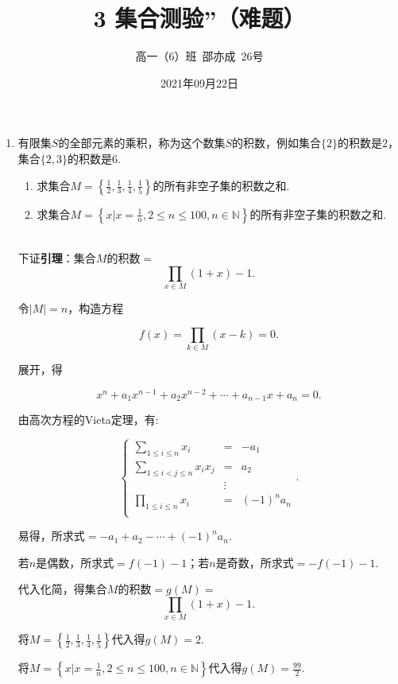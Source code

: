 \documentclass[8pt]{article}
\author{高一（6）班\ 邵亦成\ 26号}
\title{3 集合测验''（难题）}
\date{2021年09月22日}
\begin{document}
	\maketitle

	\begin{enumerate}

		\item
			有限集$S$的全部元素的乘积，称为这个数集$S$的积数，例如集合$\{2\}$的积数是$2$，集合$\{2,3\}$的积数是$6$.

			\begin{enumerate}[ (1) ]

				\item 求集合$M=\left\{\frac{1}{2},\frac{1}{3},\frac{1}{4},\frac{1}{5}\right\}$的所有非空子集的积数之和.

				\item 求集合$M=\left\{x|x=\frac{1}{n},2\leq n\leq100, n\in\mathbb{N}\right\}$的所有非空子集的积数之和.

			\end{enumerate}

			~\\

			下证\textbf{引理}：集合$M$的积数$=$$$\prod_{x\in M}(1+x)-1.$$

			令$|M|=n$，构造方程

			$$f(x)=\prod_{k\in M}(x-k)=0.$$

			展开，得

			$$x^n+a_1x^{n-1}+a_2x^{n-2}+\cdots+a_{n-1}x+a_n=0.$$

			由高次方程的Vieta定理，有:

			$$
			\left\{
			\begin{array}{rcl}
			\sum_{1\leq i \leq n}x_i&=&-a_1\\
			\sum_{1\leq i < j \leq n}x_ix_j&=&a_2\\
			&\vdots&\\
			\prod_{1\leq i \leq n}x_i&=&(-1)^{n}a_n\\
			\end{array}
			\right..
			$$

			易得，所求式$=-a_1+a_2-\cdots+(-1)^{n}a_n$.

			若$n$是偶数，所求式$=f(-1)-1$；若$n$是奇数，所求式$=-f(-1)-1$.

			代入化简，得集合$M$的积数$=g(M)=$$$\prod_{x\in M}(1+x)-1.$$

			将$M=\left\{\frac{1}{2},\frac{1}{3},\frac{1}{4},\frac{1}{5}\right\}$代入得$g(M)=2$.

			将$M=\left\{x|x=\frac{1}{n},2\leq n\leq100, n\in\mathbb{N}\right\}$代入得$g(M)=\frac{99}{2}$.

	\end{enumerate}
\end{document}
